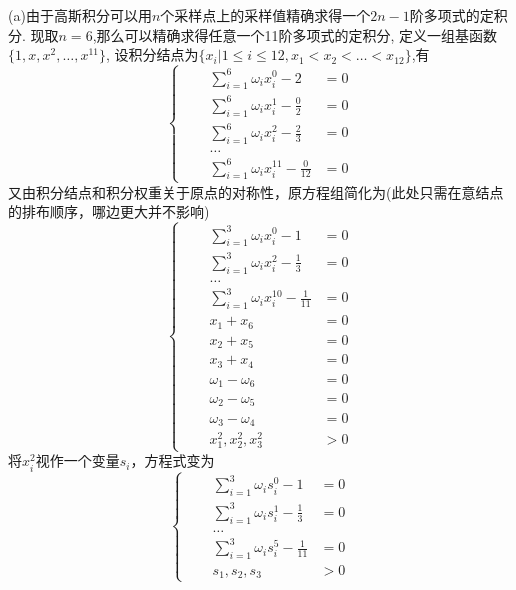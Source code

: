 \documentclass[12pt,a4paper,utf8]{ctexart}
\begin{document}
\begin{enumerate}
(a)由于高斯积分可以用$ n $个采样点上的采样值精确求得一个$ 2n-1 $阶多项式的定积分.
现取$ n = 6 $,那么可以精确求得任意一个11阶多项式的定积分,
定义一组基函数$ \{1,x,x^2,\dots ,x^11\} $,
设积分结点为$ \{x_i|1\le i \le 12,x_1 < x_2 < \dots < x_{12}\} $,有
\begin{equation}
	\left\{\begin{aligned}
			\quad &\sum_{i=1}^{6} \omega_ix_i^0-2 &= 0 \\
			\quad &\sum_{i=1}^{6} \omega_ix_i^1-\frac{0}{2} &= 0 \\
			\quad &\sum_{i=1}^{6} \omega_ix_i^2-\frac{2}{3} &= 0 \\
			\quad &\ldots &\\
			\quad &\sum_{i=1}^{6} \omega_ix_i^{11}-\frac{0}{12} &= 0
		\end{aligned}\right.
	\nonumber
\end{equation}
又由积分结点和积分权重关于原点的对称性，原方程组简化为(此处只需在意结点的排布顺序，哪边更大并不影响)
\begin{equation}
	\left\{\begin{aligned}
		\quad &\sum_{i=1}^{3} \omega_i x_i^0-1 &= 0 \\
		\quad &\sum_{i=1}^{3} \omega_i x_i^2-\frac{1}{3} &= 0 \\
		\quad &\ldots &\\
		\quad &\sum_{i=1}^{3} \omega_i x_i^{10}-\frac{1}{11} &= 0 \\
		\quad &x_1 + x_6 &= 0 \\
		\quad &x_2 + x_5 &= 0 \\
		\quad &x_3 + x_4 &= 0 \\
		\quad &\omega_1 - \omega_6 &= 0 \\
		\quad &\omega_2 - \omega_5 &= 0 \\
		\quad &\omega_3 - \omega_4 &= 0 \\
		\quad &x_1^2,x_2^2,x_3^2 &> 0
	\end{aligned}\right.
	\nonumber
\end{equation}
将$ x_i^2 $视作一个变量$ s_i $，方程式变为
\begin{equation}
	\left\{\begin{aligned}
		\quad &\sum_{i=1}^{3} \omega_is_i^0-1 &= 0 \\
		\quad &\sum_{i=1}^{3} \omega_is_i^1-\frac{1}{3} &= 0 \\
		\quad &\ldots &\\
		\quad &\sum_{i=1}^{3} \omega_is_i^5-\frac{1}{11} &= 0 \\
		\quad &s_1,s_2,s_3 &> 0
	\end{aligned}\right.
	\nonumber
\end{equation}


\end{enumerate}
\end{document}
